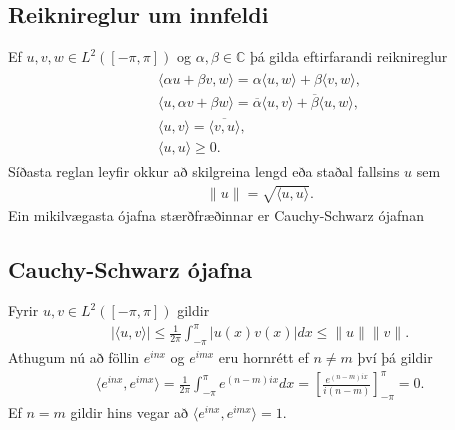 \documentclass[a4paper,10pt,icelandic]{sphinxmanual}
\begin{document}
\subsection{Reiknireglur um innfeldi}
\label{\detokenize{Kafli02:reiknireglur-um-innfeldi}}
Ef \(u,v,w\in L^2([-\pi,\pi])\) og \(\alpha,\beta \in \mathbb{C}\) þá gilda eftirfarandi reiknireglur
\begin{equation*}
\begin{split}\begin{gathered}
 {{\langle \alpha u + \beta v,w\rangle}}= \alpha{{\langle u,w\rangle}} + \beta {{\langle v,w\rangle}},\\
 {{\langle u,\alpha v + \beta w\rangle}}= \overline\alpha {{\langle u,v\rangle}} + \overline
 \beta {{\langle u,w\rangle}},\\
 {{\langle u,v\rangle}} = \overline{{{\langle v,u\rangle}}},\\
 {{\langle u,u\rangle}}\geq 0.\end{gathered}\end{split}
\end{equation*}
Síðasta reglan leyfir okkur að skilgreina lengd
eða staðal fallsins \(u\) sem
\begin{equation*}
\begin{split}\| u\|= \sqrt{{{\langle u,u\rangle}}}.\end{split}
\end{equation*}
Ein mikilvægasta ójafna stærðfræðinnar er Cauchy-Schwarz ójafnan


\subsection{Cauchy-Schwarz ójafna}
\label{\detokenize{Kafli02:cauchy-schwarz-ojafna}}
Fyrir \(u,v\in L^2([-\pi,\pi])\) gildir
\begin{equation*}
\begin{split}|\langle u,v \rangle| \leq \frac{1}{2\pi} \int_{-\pi}^\pi |u(x)v(x)|dx \leq \| u\|\| v\|.\end{split}
\end{equation*}
Athugum nú að föllin \(e^{inx}\) og \(e^{imx}\) eru hornrétt ef \(n\neq m\) því þá gildir
\begin{equation*}
\begin{split}\langle e^{inx},e^{imx}\rangle = \frac{1}{2\pi}\int_{-\pi}^\pi e^{(n-m)ix} dx =  \left[\frac{e^{(n-m)ix}}{i(n-m)}\right]_{-\pi}^\pi = 0.\end{split}
\end{equation*}
Ef \(n=m\) gildir hins vegar að \(\langle e^{inx},e^{imx}\rangle = 1\).
\end{document}
